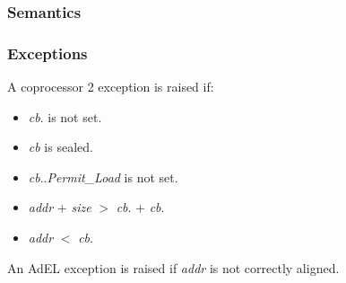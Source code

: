 \subsubsection*{Semantics}

\subsubsection*{Exceptions}

A coprocessor 2 exception is raised if:

\begin{itemize}
\item
\emph{cb}.\ctag{} is not set.
\item
\emph{cb} is sealed.
\item
\emph{cb}.\cperms{}.\emph{Permit\_Load} is not set.
\item
\emph{addr} $+$ \emph{size} $>$ \emph{cb}.\cbase{} $+$ \emph{cb}.\clength{}
\item
\emph{addr} $<$ \emph{cb}.\cbase{}
\end{itemize}

An AdEL exception is raised if \emph{addr} is not correctly aligned.
